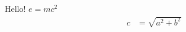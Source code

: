 \documentclass{article}
\begin{document}
Hello! $e=mc^2$
\begin{align}
c&=\sqrt{a^2+b^2}
\end{align}
\end{document}
